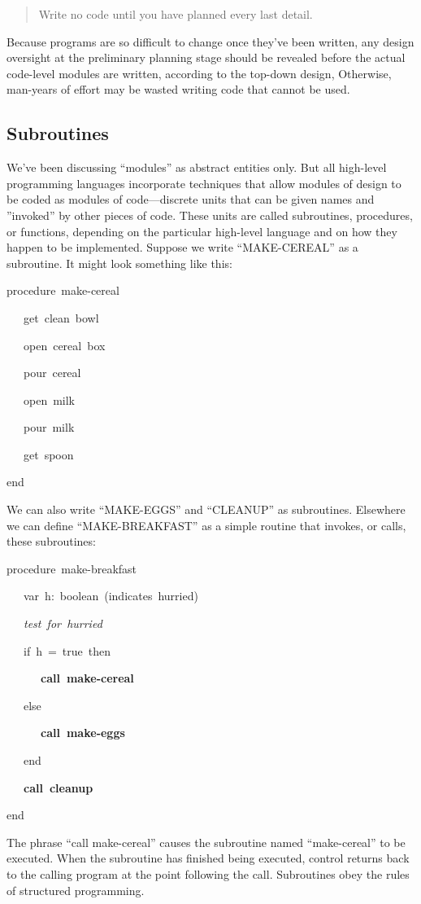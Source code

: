 \begin{quote}
Write no code until you have planned every last detail.
\end{quote}
Because programs are so difficult to change once they've been written,
any design oversight at the preliminary planning stage should be revealed
before the actual code-level modules are written, according to the
top-down design, Otherwise, man-years of effort may be wasted writing
code that cannot be used.


\subsection*{Subroutines}

We've been discussing {}``modules'' as abstract entities only. But
all high-level programming languages incorporate techniques that allow
modules of design to be coded as modules of code---discrete units
that can be given names and ''invoked'' by other pieces of code. These
units are called subroutines, procedures, or functions, depending
on the particular high-level language and on how they happen to be
implemented. Suppose we write {}``MAKE-CEREAL'' as a subroutine.
It might look something like this:

\begin{lyxcode}
procedure~make-cereal

~~~get~clean~bowl

~~~open~cereal~box

~~~pour~cereal

~~~open~milk

~~~pour~milk

~~~get~spoon

end
\end{lyxcode}
We can also write {}``MAKE-EGGS'' and {}``CLEANUP'' as subroutines.
Elsewhere we can define {}``MAKE-BREAKFAST'' as a simple routine
that invokes, or calls, these subroutines:

\begin{lyxcode}
procedure~make-breakfast

~~~var~h:~boolean~(indicates~hurried)

~~~\textit{test~for~hurried}~

~~~if~h~=~true~then

~~~~~~\textbf{call~make-cereal}~

~~~else

~~~~~~\textbf{call~make-eggs}

~~~end

~~~\textbf{call~cleanup}

end
\end{lyxcode}
The phrase {}``call make-cereal'' causes the subroutine named {}``make-cereal''
to be executed. When the subroutine has finished being executed, control
returns back to the calling program at the point following the call.
Subroutines obey the rules of structured programming.

